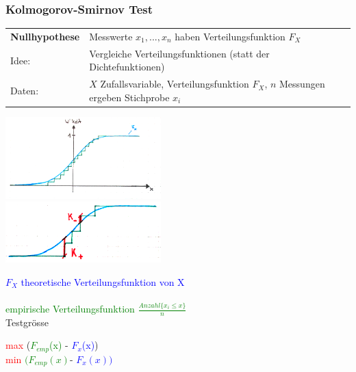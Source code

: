   	
	\subsubsection{Kolmogorov-Smirnov Test}
	\begin{tabular}{ll}
	\textbf{Nullhypothese} & Messwerte $x_1, ..., x_n$ haben Verteilungsfunktion $F_X$\\
    Idee: & Vergleiche Verteilungsfunktionen (statt der Dichtefunktionen)\\
    Daten: & $X$ Zufallsvariable, Verteilungsfunktion $F_X$, $n$ Messungen
    ergeben Stichprobe $x_i$
    \end{tabular}

	\begin{minipage}{6cm}
    \includegraphics[width=6cm]{./bilder/ks1.png}\\
    \includegraphics[width=6cm]{./bilder/ks2.png}\\
    \end{minipage}
	\begin{minipage}{12cm}
    \textcolor{blue}{$F_X$ theoretische Verteilungsfunktion von X}\\ \\
    \vspace{15mm}
    \textcolor{green}{empirische Verteilungsfunktion $\frac{Anzahl\{x_i \leq
    x \}}{n}$}\\

    Testgrösse\\
    \hspace*{0.5cm}
    	\parbox{6cm}{\textcolor{red}{max}
   			(\textcolor{green}{$F_{emp}$(x)} - 
   			\textcolor{blue}{$F_x$(x)})\\
    		\textcolor{red}{min} 
    \textcolor{green}{$(F_{emp}(x)$}-
    		\textcolor{blue}{$F_x(x))$}}

    \end{minipage}

